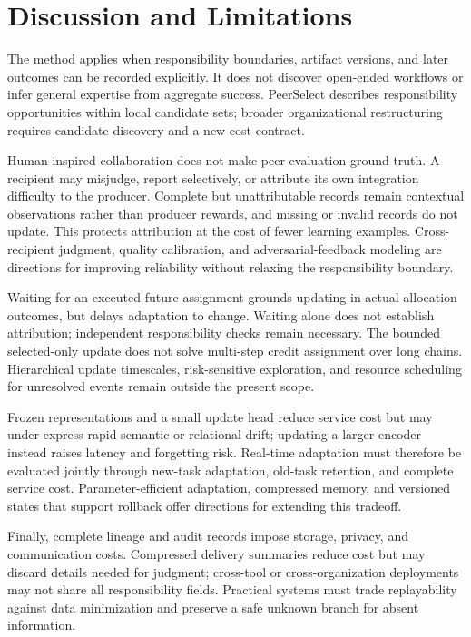 \documentclass[sigconf,anonymous]{aamas}
\begin{document}
\section{Discussion and Limitations}
The method applies when responsibility boundaries, artifact versions, and later outcomes can be recorded explicitly. It does not discover open-ended workflows or infer general expertise from aggregate success. PeerSelect describes responsibility opportunities within local candidate sets; broader organizational restructuring requires candidate discovery and a new cost contract.

Human-inspired collaboration does not make peer evaluation ground truth. A recipient may misjudge, report selectively, or attribute its own integration difficulty to the producer. Complete but unattributable records remain contextual observations rather than producer rewards, and missing or invalid records do not update. This protects attribution at the cost of fewer learning examples. Cross-recipient judgment, quality calibration, and adversarial-feedback modeling are directions for improving reliability without relaxing the responsibility boundary.

\newpage
Waiting for an executed future assignment grounds updating in actual allocation outcomes, but delays adaptation to change. Waiting alone does not establish attribution; independent responsibility checks remain necessary. The bounded selected-only update does not solve multi-step credit assignment over long chains. Hierarchical update timescales, risk-sensitive exploration, and resource scheduling for unresolved events remain outside the present scope.

Frozen representations and a small update head reduce service cost but may under-express rapid semantic or relational drift; updating a larger encoder instead raises latency and forgetting risk. Real-time adaptation must therefore be evaluated jointly through new-task adaptation, old-task retention, and complete service cost. Parameter-efficient adaptation, compressed memory, and versioned states that support rollback offer directions for extending this tradeoff.

Finally, complete lineage and audit records impose storage, privacy, and communication costs. Compressed delivery summaries reduce cost but may discard details needed for judgment; cross-tool or cross-organization deployments may not share all responsibility fields. Practical systems must trade replayability against data minimization and preserve a safe unknown branch for absent information.
\end{document}

